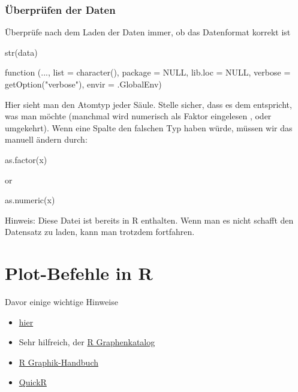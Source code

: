 \documentclass[a4paper,twoside]{tufte-book}\usepackage[]{graphicx}\usepackage[]{color}
\begin{document}
\begin{appendices}
\subsection{Überprüfen der Daten}

Überprüfe nach dem Laden der Daten immer, ob das Datenformat korrekt ist

\begin{Schunk}
\begin{Sinput}
str(data)
\end{Sinput}
\begin{Soutput}
function (..., list = character(), package = NULL, lib.loc = NULL, 
    verbose = getOption("verbose"), envir = .GlobalEnv)  
\end{Soutput}
\end{Schunk}

Hier sieht man den Atomtyp jeder Säule. Stelle sicher, dass es dem entspricht, was man möchte (manchmal wird numerisch als Faktor eingelesen , oder umgekehrt). Wenn eine Spalte den falschen Typ haben würde, müssen wir das manuell ändern durch:

\begin{Schunk}
\begin{Sinput}
as.factor(x)
\end{Sinput}
\end{Schunk}
or 
\begin{Schunk}
\begin{Sinput}
as.numeric(x)
\end{Sinput}
\end{Schunk}


Hinweis: Diese Datei ist bereits in R enthalten. Wenn man es nicht schafft den Datensatz zu laden, kann man trotzdem fortfahren.

\chapter{Plot-Befehle in R}

Davor einige wichtige Hinweise

\begin{itemize}
\item \href{http://rgraphgallery.blogspot.de/search/label/3%20vartiable%20plots}{hier}
\item Sehr hilfreich, der \href{http://shiny.stat.ubc.ca/r-graph-catalog/#}{R Graphenkatalog}
\item \href{http://rgm3.lab.nig.ac.jp/RGM/R_image_list?page=2282&init=true}{R Graphik-Handbuch}
\item \href{http://www.statmethods.net/graphs/line.html}{QuickR}
\end{itemize}



\end{appendices}
\end{document}
